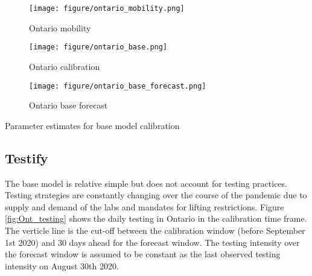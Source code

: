 \documentclass[12pt]{article}\usepackage[]{graphicx}\usepackage[]{color}
\begin{document}
\begin{figure}[ht!]
\color{fgcolor}
\texttt{[image: figure/ontario\_mobility.png]}

\caption{Ontario mobility }
\label{fig:Ont_mobility}
\end{figure}



\begin{figure}[ht!]
\color{fgcolor}
\texttt{[image: figure/ontario\_base.png]}

\caption{Ontario calibration}
\label{fig:Ont_calibration}
\end{figure}

\begin{figure}[ht!]
\color{fgcolor}
\texttt{[image: figure/ontario\_base\_forecast.png]}

\caption{Ontario base forecast}
\label{fig:Ont_calibration_base_forecast}
\end{figure}

\begin{table}
\centering

\caption{Parameter estimates for base model calibration}
\label{table:base}
\end{table}


\FloatBarrier

\subsection{Testify}

The base model is relative simple but does not account for testing practices. Testing strategies are constantly changing over the course of the pandemic due to supply and demand of the labs and mandates for lifting restrictions. Figure \ref{fig:Ont_testing} shows the daily testing in Ontario in the calibration time frame. The verticle line is the cut-off between the calibration window (before September 1st 2020) and 30 days ahead for the forecast window. The testing intensity over the forecast window is assumed to be constant as the last observed testing intensity on August 30th 2020.  
\end{document}
